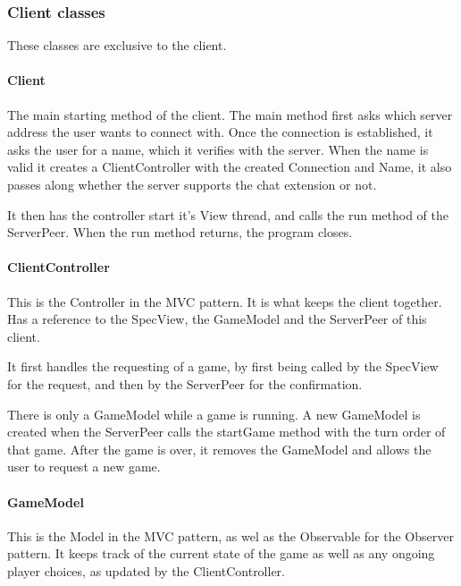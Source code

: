 \documentclass[12pt, letterpaper]{article}
\begin{document}

    \subsubsection{Client classes}

    These classes are exclusive to the client.

    \paragraph{Client}
    The main starting method of the client.
    The main method first asks which server address the user wants to connect with.
    Once the connection is established, it asks the user for a name, which it verifies with the server.
    When the name is valid it creates a ClientController with the created Connection and Name, it also passes along
    whether the server supports the chat extension or not.

    It then has the controller start it's View thread, and calls the run method of the ServerPeer.
    When the run method returns, the program closes.

    \paragraph{ClientController}
    This is the Controller in the MVC pattern.
    It is what keeps the client together.
    Has a reference to the SpecView, the GameModel and the ServerPeer of this client.

    It first handles the requesting of a game, by first being called by the SpecView for the request, and then by the
    ServerPeer for the confirmation.

    There is only a GameModel while a game is running.
    A new GameModel is created when the ServerPeer calls the startGame method with the turn order of that game.
    After the game is over, it removes the GameModel and allows the user to request a new game.

    \paragraph{GameModel}
    This is the Model in the MVC pattern, as wel as the Observable for the Observer pattern.
    It keeps track of the current state of the game as well as any ongoing player choices,
    as updated by the ClientController.
\end{document}
